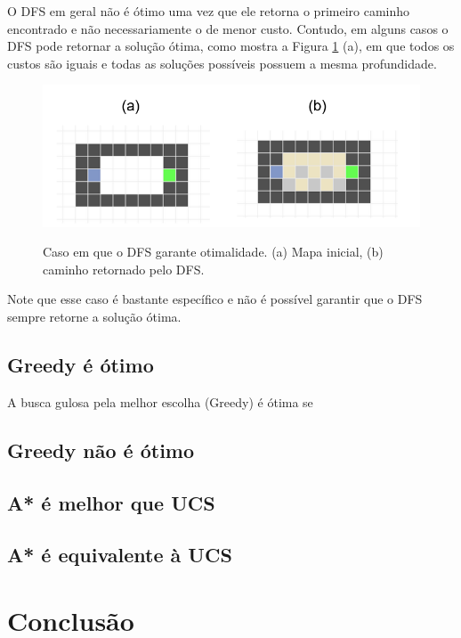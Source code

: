 \documentclass[letterpaper]{article} %
\begin{document}
O DFS em geral não é ótimo uma vez que ele retorna o primeiro caminho encontrado
e não necessariamente o de menor custo. Contudo, em alguns casos o DFS pode
retornar a solução ótima, como mostra a Figura \ref{fig:DFS_otimo} (a), em que 
todos os custos são iguais e todas as soluções possíveis possuem a mesma 
profundidade.

\begin{figure}[htb]
	\centering 
    \caption{Caso em que o DFS garante otimalidade. (a) Mapa inicial, (b)
	caminho retornado pelo DFS.}
	\includegraphics[width=\columnwidth]{images/DFS_otimo.png}
	\label{fig:DFS_otimo}
\end{figure}

Note que esse caso é bastante específico e não é possível garantir que o DFS
sempre retorne a solução ótima. 

\subsection{Greedy é ótimo}

A busca gulosa pela melhor escolha (Greedy) é ótima se 

\subsection{Greedy não é ótimo}


\subsection{A* é melhor que UCS}

\subsection{A* é equivalente à UCS}

\section{Conclusão}



\end{document}
